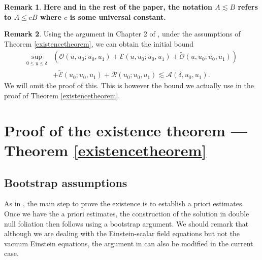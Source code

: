 \documentclass[11pt,reqno]{amsart}
\theoremstyle{definition}
\newtheorem{remark}{Remark}[section]
\numberwithin{equation}{section}
\def\ub{\underline{u}}
\begin{document}
 \begin{remark}
{\bf Here and in the rest of the paper, the notation $A\lesssim B$ refers to $A\le cB$ where $c$ is some universal constant. }
\end{remark}
\begin{remark}
Using the argument in Chapter 2 of \cite{Chr}, under the assumptions of Theorem \ref{existencetheorem}, we can obtain the initial bound
\begin{align*}
\sup_{0\le\ub\le\delta}&(\mathcal{O}(\ub,u_0;u_0,u_1)+\mathcal{E}(\ub,u_0;u_0,u_1)+\widetilde{\mathcal{O}}(\ub,u_0;u_0,u_1))\\
&+\widetilde{\mathcal{E}}(u_0;u_0,u_1)+\mathcal{R}(u_0;u_0,u_1)\lesssim\mathcal{A}(\delta,u_0,u_1).
\end{align*}
We will omit the proof of this. This is however the bound we actually use in the proof of Theorem \ref{existencetheorem}.
\end{remark}





\section{Proof of the existence theorem --- Theorem \ref{existencetheorem}}\label{APrioriEstimate}

\subsection{Bootstrap assumptions}

As in \cite{Chr}, the main step to prove the existence is to establish a priori estimates. Once we have the a priori estimates, the construction of the solution in double null foliation then follows using a bootstrap argument. We should remark that although we are dealing with the Einstein-scalar field equations but not the vacuum Einstein equations, the argument in \cite{Chr} can also be modified in the current case.
\end{document}
